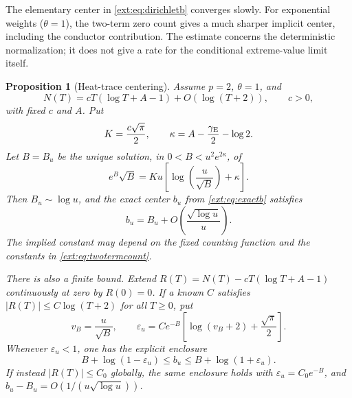 \documentclass[11pt]{article}
\newtheorem{proposition}[theorem]{Proposition}
\theoremstyle{definition}
\theoremstyle{remark}
\begin{document}
The elementary center in \eqref{ext:eq:dirichletb} converges slowly.
For exponential weights ($\theta=1$), the two-term zero count gives a
much sharper implicit center, including the conductor contribution.
The estimate concerns the deterministic normalization; it does not
give a rate for the conditional extreme-value limit itself.

\begin{proposition}[Heat-trace centering]\label{ext:prop:refinedcenter}
Assume $p=2$, $\theta=1$, and
\begin{equation}\label{ext:eq:twotermcount}
 N(T)=cT(\log T+A-1)+O(\log(T+2)),\qquad c>0,
\end{equation}
with fixed $c$ and $A$.  Put
\[
 K=\frac{c\sqrt\pi}{2},\qquad
 \kappa=A-\frac{\gamma_{\rm E}}2-\log2.
\]
Let $B=B_u$ be the unique solution, in
$0<B<u^2e^{2\kappa}$, of
\begin{equation}\label{ext:eq:refinedroot}
 e^B\sqrt B
   =Ku\left[\log\left(\frac{u}{\sqrt B}\right)+\kappa\right].
\end{equation}
Then $B_u\sim\log u$, and the exact center $b_u$ from
\eqref{ext:eq:exactb} satisfies
\begin{equation}\label{ext:eq:refinederror}
 b_u=B_u+O\left(\frac{\sqrt{\log u}}u\right).
\end{equation}
The implied constant may depend on the fixed counting function and
the constants in \eqref{ext:eq:twotermcount}.

There is also a finite bound.  Extend
$R(T)=N(T)-cT(\log T+A-1)$ continuously at zero by $R(0)=0$.
If a known $C$ satisfies
$|R(T)|\le C\log(T+2)$ for all $T\ge0$, put
\[
 v_B=\frac{u}{\sqrt B},\qquad
 \varepsilon_u=C e^{-B}
       \left[\log(v_B+2)+\frac{\sqrt\pi}{2}\right].
\]
Whenever $\varepsilon_u<1$, one has the explicit enclosure
\begin{equation}\label{ext:eq:refinedbracket}
 B+\log(1-\varepsilon_u)
       \le b_u\le
 B+\log(1+\varepsilon_u).
\end{equation}
If instead $|R(T)|\le C_0$ globally, the same enclosure holds with
$\varepsilon_u=C_0e^{-B}$, and
$b_u-B_u=O(1/(u\sqrt{\log u}))$.
\end{proposition}
\end{document}
